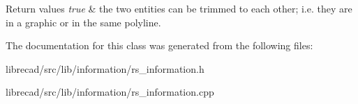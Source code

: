 \begin{DoxyRetVals}{Return values}
{\em true} & the two entities can be trimmed to each other; i.\-e. they are in a graphic or in the same polyline. \\
\hline
\end{DoxyRetVals}


The documentation for this class was generated from the following files\-:\begin{DoxyCompactItemize}
\item 
librecad/src/lib/information/rs\-\_\-information.\-h\item 
librecad/src/lib/information/rs\-\_\-information.\-cpp\end{DoxyCompactItemize}
